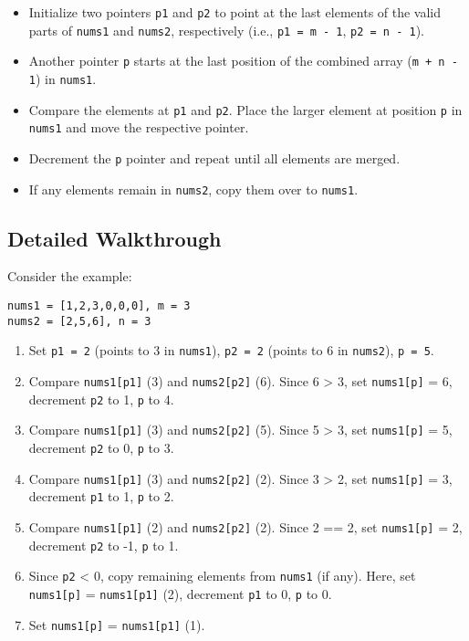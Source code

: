 \begin{itemize}
    \item Initialize two pointers \texttt{p1} and \texttt{p2} to point at the last elements of the valid parts of \texttt{nums1} and \texttt{nums2}, respectively (i.e., \texttt{p1 = m - 1}, \texttt{p2 = n - 1}).
    \item Another pointer \texttt{p} starts at the last position of the combined array (\texttt{m + n - 1}) in \texttt{nums1}.
    \item Compare the elements at \texttt{p1} and \texttt{p2}. Place the larger element at position \texttt{p} in \texttt{nums1} and move the respective pointer.
    \item Decrement the \texttt{p} pointer and repeat until all elements are merged.
    \item If any elements remain in \texttt{nums2}, copy them over to \texttt{nums1}.
\end{itemize}

\subsection*{Detailed Walkthrough}

Consider the example:

\begin{verbatim}
nums1 = [1,2,3,0,0,0], m = 3
nums2 = [2,5,6], n = 3
\end{verbatim}

\begin{enumerate}
    \item Set \texttt{p1 = 2} (points to 3 in \texttt{nums1}), \texttt{p2 = 2} (points to 6 in \texttt{nums2}), \texttt{p = 5}.
    \item Compare \texttt{nums1[p1]} (3) and \texttt{nums2[p2]} (6). Since 6 > 3, set \texttt{nums1[p]} = 6, decrement \texttt{p2} to 1, \texttt{p} to 4.
    \item Compare \texttt{nums1[p1]} (3) and \texttt{nums2[p2]} (5). Since 5 > 3, set \texttt{nums1[p]} = 5, decrement \texttt{p2} to 0, \texttt{p} to 3.
    \item Compare \texttt{nums1[p1]} (3) and \texttt{nums2[p2]} (2). Since 3 > 2, set \texttt{nums1[p]} = 3, decrement \texttt{p1} to 1, \texttt{p} to 2.
    \item Compare \texttt{nums1[p1]} (2) and \texttt{nums2[p2]} (2). Since 2 == 2, set \texttt{nums1[p]} = 2, decrement \texttt{p2} to -1, \texttt{p} to 1.
    \item Since \texttt{p2} < 0, copy remaining elements from \texttt{nums1} (if any). Here, set \texttt{nums1[p]} = \texttt{nums1[p1]} (2), decrement \texttt{p1} to 0, \texttt{p} to 0.
    \item Set \texttt{nums1[p]} = \texttt{nums1[p1]} (1).
\end{enumerate}

